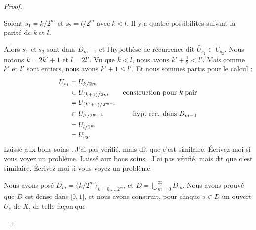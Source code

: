 \begin{proof}
\begin{subproof}
    Soient \( s_1=k/2^m\) et \( s_2=l/2^m\) avec \( k<l\). Il y a quatre possibilités suivant la parité de \( k\) et \( l\).
    \begin{subproof}
        Alors \( s_1\) et \( s_2\) sont dans \( D_{m-1}\) et l'hypothèse de récurrence dit \( \bar U_{s_1}\subset U_{s_2}\).
        Nous notons \( k=2k'+1\) et \( l=2l'\). Vu que \( k<l\), nous avons $k'+\frac{ 1 }{2}<l'$. Mais comme \( k'\) et \( l'\) sont entiers, nous avons \( k'+1\leq l'\). Et nous sommes partis pour le calcul :
        \begin{subequations}
            \begin{align}
                \bar U_{s_1}&=\bar U_{k/2m}\\
                &\subset U_{(k+1)/2m}       & \text{construction pour \( k \) pair}\\
                &=U_{(k'+1)/2^{m-1}}\\
                &\subset U_{l'/2^{m-1}} & \text{hyp. rec. dans \( D_{m-1}\)}\\
                &=U_{l/2^m}   \\
                &=U_{s_2}.
            \end{align}
        \end{subequations}
        Laissé aux bons soins . J'ai pas vérifié, mais \cite{THOooKYYEooLFcNpg} dit que c'est similaire. Écrivez-moi si vous voyez un problème.
        Laissé aux bons soins . J'ai pas vérifié, mais \cite{THOooKYYEooLFcNpg} dit que c'est similaire. Écrivez-moi si vous voyez un problème.
    \end{subproof}
    \spitem[Résumé]
    Nous avons posé \( D_m=\{ k/2^m \}_{k=0,\ldots, 2^m}\), et \( D=\bigcup_{m=0}^{\infty}D_m\). Nous avons prouvé que \( D\) est dense dans \( \mathopen[ 0 , 1 \mathclose]\), et nous avons construit, pour chaque \( s\in D\) un ouvert \( U_s\) de \( X\), de telle façon que

\end{subproof}
\end{proof}
